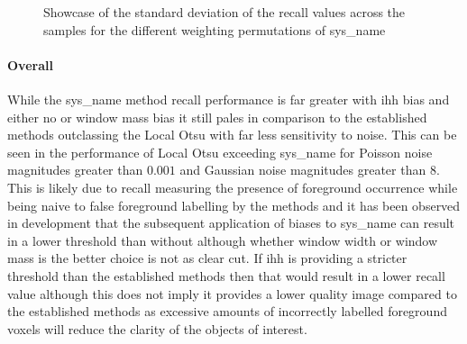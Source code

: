\begin{figure}[h!]
    \centering
    \caption[Showcase of the standard deviation of the recall values across the samples for the different weighting permutations of AHT]{Showcase of the standard deviation of the recall values across the samples for the different weighting permutations of \gls{sys_name}}
    \label{fig:std_ihh_recall}
\end{figure}
\paragraph{Overall}
While the \gls{sys_name} method recall performance is far greater with \gls{ihh} bias and either no or window mass bias it still pales in comparison to the established methods outclassing the Local Otsu with far less sensitivity to noise. This can be seen in the performance of Local Otsu exceeding \gls{sys_name} for Poisson noise magnitudes greater than $0.001$ and Gaussian noise magnitudes greater than $8$. This is likely due to recall measuring the presence of foreground occurrence while being naive to false foreground labelling by the methods and it has been observed in development that the subsequent application of biases to \gls{sys_name} can result in a lower threshold than without although whether window width or window mass is the better choice is not as clear cut. If \gls{ihh} is providing a stricter threshold than the established methods then that would result in a lower recall value although this does not imply it provides a lower quality image compared to the established methods as excessive amounts of incorrectly labelled foreground voxels will reduce the clarity of the objects of interest.

